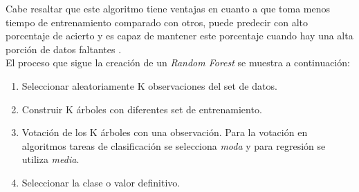 \begin{itemize}
    Cabe resaltar que este algoritmo tiene ventajas en cuanto a que toma menos tiempo de entrenamiento comparado con otros, puede predecir con alto porcentaje de acierto y es capaz de mantener este porcentaje cuando hay una alta porción de datos faltantes \cite{javatpoint}.\\
    El proceso \cite{3} que sigue la creación de un \textit{Random Forest} se muestra a continuación:
    \begin{enumerate}
        \item Seleccionar aleatoriamente K observaciones del set de datos.
        \item Construir K árboles con diferentes set de entrenamiento.
        \item Votación de los K árboles con una observación. Para la votación en algoritmos tareas de clasificación se selecciona \textit{moda} y para regresión se utiliza \textit{media}.
        \item Seleccionar la clase o valor definitivo.
    \end{enumerate}
\end{itemize}

